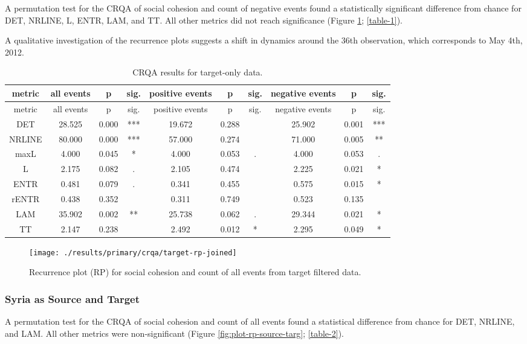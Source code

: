\documentclass[english,man]{apa6}
\begin{document}
A permutation test for the CRQA of social cohesion and count of negative events
found a statistically significant difference from chance for DET, NRLINE, L,
ENTR, LAM, and TT. All other metrics did not reach significance (Figure
\ref{fig:plot-rp-targ}; \autoref{table-1}).

A qualitative investigation of the recurrence plots suggests a shift in dynamics
around the 36th observation, which corresponds to May 4th, 2012.

\begin{longtable}[]{@{}cccccccccc@{}}
\caption{\label{table-1}CRQA results for target-only data.}\tabularnewline
\toprule
metric & all events & p & sig. & positive events & p & sig. & negative events & p & sig.\tabularnewline
\midrule
\endfirsthead
\toprule
metric & all events & p & sig. & positive events & p & sig. & negative events & p & sig.\tabularnewline
\midrule
\endhead
DET & 28.525 & 0.000 & *** & 19.672 & 0.288 & & 25.902 & 0.001 & ***\tabularnewline
NRLINE & 80.000 & 0.000 & *** & 57.000 & 0.274 & & 71.000 & 0.005 & **\tabularnewline
maxL & 4.000 & 0.045 & * & 4.000 & 0.053 & . & 4.000 & 0.053 & .\tabularnewline
L & 2.175 & 0.082 & . & 2.105 & 0.474 & & 2.225 & 0.021 & *\tabularnewline
ENTR & 0.481 & 0.079 & . & 0.341 & 0.455 & & 0.575 & 0.015 & *\tabularnewline
rENTR & 0.438 & 0.352 & & 0.311 & 0.749 & & 0.523 & 0.135 &\tabularnewline
LAM & 35.902 & 0.002 & ** & 25.738 & 0.062 & . & 29.344 & 0.021 & *\tabularnewline
TT & 2.147 & 0.238 & & 2.492 & 0.012 & * & 2.295 & 0.049 & *\tabularnewline
\bottomrule
\end{longtable}

\begin{figure}
\texttt{[image: ./results/primary/crqa/target-rp-joined]} \caption{Recurrence plot (RP) for social cohesion and count of all events from target filtered data.}\label{fig:plot-rp-targ}
\end{figure}

\hypertarget{syria-as-source-and-target}{%
\subsubsection{Syria as Source and Target}\label{syria-as-source-and-target}}

A permutation test for the CRQA of social cohesion and count of all events found
a statistical difference from chance for DET, NRLINE, and LAM. All other metrics
were non-significant (Figure \ref{fig:plot-rp-source-targ};
\autoref{table-2}).
\end{document}
